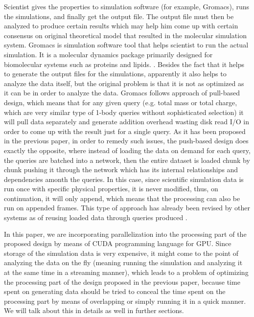 \documentclass[11pt,a4paper]{report}
\begin{document}
Scientist gives the properties to simulation software (for example, Gromacs), runs the simulations, and finally get the output file. The output file must then be analyzed to produce certain results which may help him come up with certain consensus on original theoretical model that resulted in the molecular simulation system\cite{Frenkel:api01}. Gromacs is simulation software tool that helps scientist to run the actual simulation. It is a molecular dynamics package primarily designed for biomolecular systems such as proteins and lipids. \cite{Gromacs-online}. Besides the fact that it helps to generate the output files for the simulations, apparently it also helps to analyze the data itself, but the original problem is that it is not as optimized as it can be in order to analyze the data. Gromacs follows approach of pull-based design, which means that for any given query (e.g. total mass or total charge, which are very similar type of 1-body queries without sophisticated selection) it will pull data separately and generate addition overhead wasting disk read I/O in order to come up with the result just for a single query. As it has been proposed in the previous paper, in order to remedy such issues, the push-based design does exactly the opposite, where instead of loading the data on demand for each query, the queries are batched into a network, then the entire dataset is loaded chunk by chunk pushing it through the network which has its internal relationships and dependencies amonth the queries. In this case, since scientific simulation data is run once with specific physical properties, it is never modified, thus, on continuation, it will only append, which means that the processing can also be run on appended frames. \cite{mainPaper}
This type of approach has already been revised by other systems \cite {DataPath,Volcano,Qpipe} as of reusing loaded data through queries produced \cite {Candea,PredictablePerformance,CooperativeScans}.

In this paper, we are incorporating parallelization into the processing part of the proposed design by means of CUDA programming language for GPU. Since storage of the simulation data is very expensive, it might come to the point of analyzing the data on the fly (meaning running the simulation and analyzing it at the same time in a streaming manner), which leads to a problem of optimizing the processing part of the design proposed in the previous paper, because time spent on generating data should be tried to conceal the time spent on the processing part by means of overlapping or simply running it in a quick manner. We will talk about this in details as well in further sections.
\end{document}
